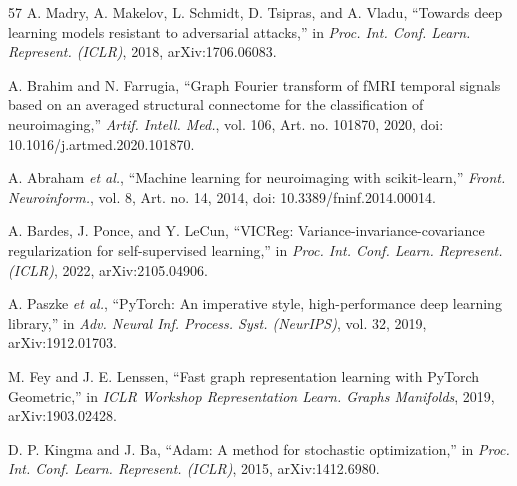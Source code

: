 \begin{thebibliography}{57}
A. Madry, A. Makelov, L. Schmidt, D. Tsipras, and A. Vladu, ``Towards deep learning models resistant to adversarial attacks,'' in \emph{Proc. Int. Conf. Learn. Represent. (ICLR)}, 2018, arXiv:1706.06083.

A. Brahim and N. Farrugia, ``Graph Fourier transform of fMRI temporal signals based on an averaged structural connectome for the classification of neuroimaging,'' \emph{Artif. Intell. Med.}, vol. 106, Art. no. 101870, 2020, doi: 10.1016/j.artmed.2020.101870.

A. Abraham \emph{et al.}, ``Machine learning for neuroimaging with scikit-learn,'' \emph{Front. Neuroinform.}, vol. 8, Art. no. 14, 2014, doi: 10.3389/fninf.2014.00014.

A. Bardes, J. Ponce, and Y. LeCun, ``VICReg: Variance-invariance-covariance regularization for self-supervised learning,'' in \emph{Proc. Int. Conf. Learn. Represent. (ICLR)}, 2022, arXiv:2105.04906.

A. Paszke \emph{et al.}, ``PyTorch: An imperative style, high-performance deep learning library,'' in \emph{Adv. Neural Inf. Process. Syst. (NeurIPS)}, vol. 32, 2019, arXiv:1912.01703.

M. Fey and J. E. Lenssen, ``Fast graph representation learning with PyTorch Geometric,'' in \emph{ICLR Workshop Representation Learn. Graphs Manifolds}, 2019, arXiv:1903.02428.

D. P. Kingma and J. Ba, ``Adam: A method for stochastic optimization,'' in \emph{Proc. Int. Conf. Learn. Represent. (ICLR)}, 2015, arXiv:1412.6980.

\end{thebibliography}
